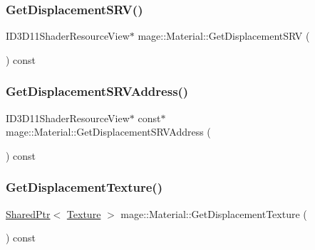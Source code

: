 \hypertarget{structmage_1_1_material_a638ee0913aa0722f499c883b71549503}{}\label{structmage_1_1_material_a638ee0913aa0722f499c883b71549503} 
\subsubsection{\texorpdfstring{Get\+Displacement\+S\+R\+V()}{GetDisplacementSRV()}}
{\footnotesize\ttfamily I\+D3\+D11\+Shader\+Resource\+View$\ast$ mage\+::\+Material\+::\+Get\+Displacement\+S\+RV (\begin{DoxyParamCaption}{ }\end{DoxyParamCaption}) const\hspace{0.3cm}{\ttfamily [noexcept]}}

\hypertarget{structmage_1_1_material_a7672015b558ebbaa52e070f65b052b2e}{}\label{structmage_1_1_material_a7672015b558ebbaa52e070f65b052b2e} 
\subsubsection{\texorpdfstring{Get\+Displacement\+S\+R\+V\+Address()}{GetDisplacementSRVAddress()}}
{\footnotesize\ttfamily I\+D3\+D11\+Shader\+Resource\+View$\ast$ const$\ast$ mage\+::\+Material\+::\+Get\+Displacement\+S\+R\+V\+Address (\begin{DoxyParamCaption}{ }\end{DoxyParamCaption}) const\hspace{0.3cm}{\ttfamily [noexcept]}}

\hypertarget{structmage_1_1_material_ab548fbf5844ae7cd2822304ef7fb9602}{}\label{structmage_1_1_material_ab548fbf5844ae7cd2822304ef7fb9602} 
\subsubsection{\texorpdfstring{Get\+Displacement\+Texture()}{GetDisplacementTexture()}}
{\footnotesize\ttfamily \hyperlink{namespacemage_a1e01ae66713838a7a67d30e44c67703e}{Shared\+Ptr}$<$ \hyperlink{classmage_1_1_texture}{Texture} $>$ mage\+::\+Material\+::\+Get\+Displacement\+Texture (\begin{DoxyParamCaption}{ }\end{DoxyParamCaption}) const\hspace{0.3cm}{\ttfamily [noexcept]}}


